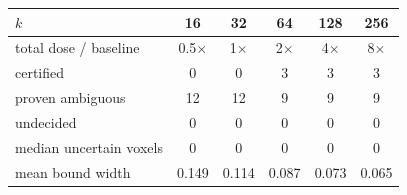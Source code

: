 \begin{tabular}{@{}lccccc@{}}\toprule
$k$ & 16 & 32 & 64 & 128 & 256\\\midrule
total dose / baseline & 0.5$\times$ & 1$\times$ & 2$\times$ & 4$\times$ & 8$\times$\\
certified & 0 & 0 & 3 & 3 & 3\\
proven ambiguous & 12 & 12 & 9 & 9 & 9\\
undecided & 0 & 0 & 0 & 0 & 0\\
median uncertain voxels & 0 & 0 & 0 & 0 & 0\\
mean bound width & 0.149 & 0.114 & 0.087 & 0.073 & 0.065\\
\bottomrule\end{tabular}
